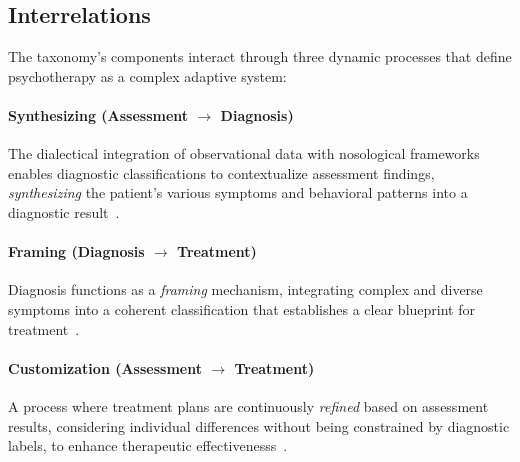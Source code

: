 \subsection{Interrelations}
The taxonomy's components interact through three dynamic processes that define psychotherapy as a complex adaptive system:

\paragraph{Synthesizing (Assessment $\rightarrow$ Diagnosis)} The dialectical integration of observational data with nosological frameworks enables diagnostic classifications to contextualize assessment findings, \textit{synthesizing} the patient's various symptoms and behavioral patterns into a diagnostic result~\cite{rencic2016understanding}.

\paragraph{Framing (Diagnosis $\rightarrow$ Treatment)} Diagnosis functions as a \textit{framing} mechanism, integrating complex and diverse symptoms into a coherent classification that establishes a clear blueprint for treatment~\cite{Section2:11}.

\paragraph{Customization (Assessment $\rightarrow$ Treatment)}  A process where treatment plans are continuously \textit{refined} based on assessment results, considering individual differences without being constrained by diagnostic labels, to enhance therapeutic effectivenesss~\cite{Section2:5}.






